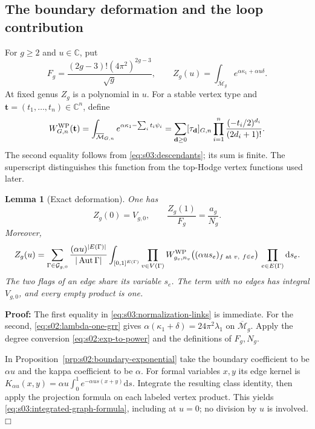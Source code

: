 \documentclass[a4paper,10pt]{article}
\numberwithin{equation}{section}
\newcommand{\MM}{\overline{\mathcal{M}}}
\newcommand{\dd}{\mathrm{d}}
\theoremstyle{paperplain}
\newtheorem{lmm}[thm]{Lemma}
\theoremstyle{paperremark}
\theoremstyle{paperplain}
\newenvironment{prf}{\noindent \textbf{Proof: }}{\hfill $\mdlgwhtsquare$\par\addvspace{0.5\baselineskip}}
\begin{document}
\subsection{The boundary deformation and the loop contribution}
\label{subsec:s03:02}

For $g\geq2$ and $u\in\mathbb C$, put
\begin{equation}
\label{eq:s03:deformation}
F_g=\frac{(2g-3)!(4\pi^2)^{2g-3}}{\sqrt g},
\qquad
Z_g(u)=\int_{\MM_g}e^{\alpha\kappa_1+\alpha u\delta}.
\end{equation}
At fixed genus $Z_g$ is a polynomial in $u$. For a stable vertex type
and $\mathbf t=(t_1,\ldots,t_n)\in\mathbb C^n$, define
\begin{equation}
\label{eq:s03:vertex-function}
W^{\rm WP}_{G,n}(\mathbf t)
=\int_{\MM_{G,n}}e^{\alpha\kappa_1-\sum_i t_i\psi_i}
=\sum_{\mathbf d\geq0}[\tau_{\mathbf d}]_{G,n}
  \prod_{i=1}^n\frac{(-t_i/2)^{d_i}}{(2d_i+1)!}.
\end{equation}
The second equality follows from \eqref{eq:s03:descendants}; its sum
is finite. The superscript distinguishes this function from the
top-Hodge vertex functions used later.

\begin{lmm}[Exact deformation]
\label{lmm:s03:exact-deformation}
One has
\begin{equation}
\label{eq:s03:normalization-links}
Z_g(0)=V_{g,0},\qquad
\frac{Z_g(1)}{F_g}=\frac{a_g}{N_g}.
\end{equation}
Moreover,
\begin{equation}
\label{eq:s03:integrated-graph-formula}
Z_g(u)=\sum_{\Gamma\in\mathcal G_{g,0}}
 \frac{(\alpha u)^{|E(\Gamma)|}}{|\operatorname{Aut}\Gamma|}
 \int_{[0,1]^{E(\Gamma)}}
 \prod_{v\in V(\Gamma)}
 W^{\rm WP}_{g_v,n_v}
       \bigl((\alpha u s_e)_{f\text{ at }v,\ f\in e}\bigr)
 \,\prod_{e\in E(\Gamma)}\dd s_e.
\end{equation}
The two flags of an edge share its variable $s_e$. The term with no
edges has integral $V_{g,0}$, and every empty product is one.
\end{lmm}
\begin{prf}
The first equality in \eqref{eq:s03:normalization-links} is immediate.
For the second, \eqref{eq:s02:lambda-one-grr} gives
$\alpha(\kappa_1+\delta)=24\pi^2\lambda_1$ on $\MM_g$.
Apply the degree conversion \eqref{eq:s02:exp-to-power} and the
definitions of $F_g,N_g$.

In Proposition~\ref{prp:s02:boundary-exponential} take the boundary
coefficient to be $\alpha u$ and the kappa coefficient to be $\alpha$.
For formal variables $x,y$ its edge kernel is
$K_{\alpha u}(x,y)=\alpha u\int_0^1e^{-\alpha u s(x+y)}\dd s$.
Integrate the resulting class identity, then apply the projection
formula on each labeled vertex product. This yields
\eqref{eq:s03:integrated-graph-formula}, including at $u=0$; no division
by $u$ is involved.
\end{prf}
\end{document}
